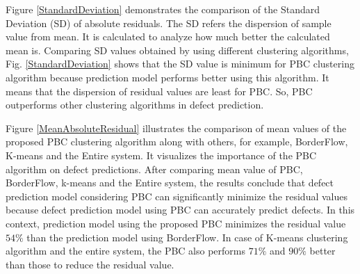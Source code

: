 \documentclass[12pt]{report}
\begin{document}
%

Figure \ref{StandardDeviation} demonstrates the comparison of the Standard Deviation (SD) of absolute residuals. The SD refers the dispersion of sample value from mean. It is calculated to analyze how much better the calculated mean is. Comparing SD values obtained by using different clustering algorithms, Fig. \ref{StandardDeviation} shows that the SD value is minimum for PBC clustering algorithm because prediction model performs better using this algorithm. It means that the dispersion of residual values are least for PBC. So, PBC outperforms other clustering algorithms in defect prediction.   

Figure \ref{MeanAbsoluteResidual} illustrates the comparison of mean values of the proposed PBC clustering algorithm along with others, for example, BorderFlow, K-means and the Entire system. It visualizes the importance of the PBC algorithm on defect predictions. After comparing mean value of PBC, BorderFlow, k-means and the Entire system, the results conclude that defect prediction model considering PBC can significantly minimize the residual values because defect prediction model using PBC can accurately predict defects. In this context, prediction model using the proposed PBC minimizes the residual value $54\%$ than the prediction model using BorderFlow. In case of K-means clustering algorithm and the entire system, the PBC also performs $71\%$ and $90\%$ better than those to reduce the residual value. 
\end{document}
